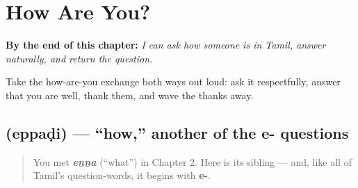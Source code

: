 
\chapter{How Are You?}
\label{ch:responding}

\begin{chapteropening}
\textbf{By the end of this chapter:} \emph{I can ask how someone is in Tamil, answer naturally, and return the question.}

Take the how-are-you exchange both ways out loud: ask it respectfully, answer that you are well, thank them, and wave the thanks away.
\end{chapteropening}

\section[\texorpdfstring{\ta{எப்படி} (eppaḍi)}{எப்படி (eppaḍi)}]{ (eppaḍi) — \textquotedblleft{}how,\textquotedblright{} another of the e- questions}

\label{lesson:TA-C03-eppadi}



\begin{quote}
You met \emph{\textbf{eṉṉa}} (\textquotedblleft{}what\textquotedblright{}) in Chapter 2. Here is its sibling — and, like all of Tamil's question-words, it begins with \textbf{e-}.
\end{quote}

